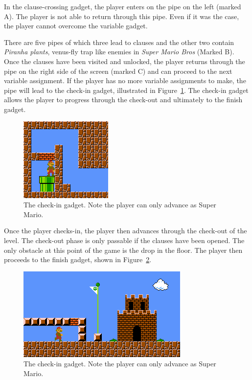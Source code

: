 \documentclass[11pt, a4paper, oneside]{report} %
\begin{document}


In the clause-crossing gadget, the player enters on the pipe on the left (marked
A). The player is not able to return through this pipe. Even if it was the case,
the player cannot overcome the variable gadget.

There are five pipes of which three lead to clauses and the other two contain
\textit{Piranha plants}, venus-fly trap like enemies in \textit{Super Mario
Bros} (Marked B). Once the clauses have been visited and unlocked, the player
returns through the pipe on the right side of the screen (marked C) and can
proceed to the next variable assignment. If the player has no more variable
assignments to make, the pipe will lead to the check-in gadget, illustrated in
Figure~\ref{check-in}. The check-in gadget allows the player to progress through
the check-out and ultimately to the finish gadget.

\begin{figure}[ht!]

  \centering
    \includegraphics[scale=1.2]{check-out}
  \caption{The check-in gadget. Note the player can only advance as Super Mario.}
  \label{check-in}
\end{figure}

Once the player checks-in, the player then advances through the check-out of the
level. The check-out phase is only passable if the clauses have been opened. The
only obstacle at this point of the game is the drop in the floor. The player
then proceeds to the finish gadget, shown in Figure~\ref{finish}.

\begin{figure}[ht!]

  \centering
    \includegraphics[scale=1.0]{finish}
  \caption{The check-in gadget. Note the player can only advance as Super Mario.}
  \label{finish}
\end{figure}
\end{document}
